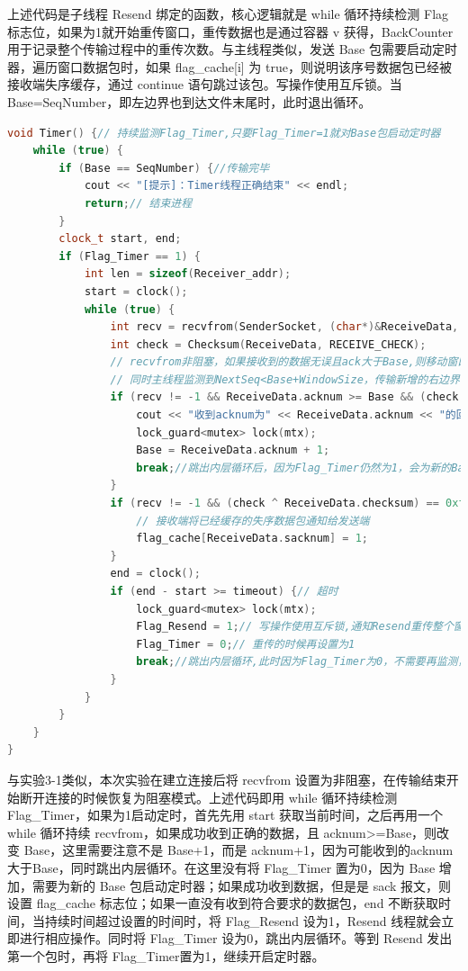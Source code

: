 \documentclass[UTF8,a4paper,10pt]{ctexart}
\begin{document}
上述代码是子线程 Resend 绑定的函数，核心逻辑就是 while 循环持续检测 Flag 标志位，如果为1就开始重传窗口，重传数据也是通过容器 v 获得，BackCounter 用于记录整个传输过程中的重传次数。与主线程类似，发送 Base 包需要启动定时器，遍历窗口数据包时，如果 flag\_cache[i] 为 true，则说明该序号数据包已经被接收端失序缓存，通过 continue 语句跳过该包。写操作使用互斥锁。当 Base=SeqNumber，即左边界也到达文件末尾时，此时退出循环。
\begin{lstlisting}[frame=trbl,language={C++}]
void Timer() {// 持续监测Flag_Timer,只要Flag_Timer=1就对Base包启动定时器
    while (true) {
        if (Base == SeqNumber) {//传输完毕
            cout << "[提示]：Timer线程正确结束" << endl;
            return;// 结束进程
        }
        clock_t start, end;
        if (Flag_Timer == 1) {
            int len = sizeof(Receiver_addr);
            start = clock();
            while (true) {
                int recv = recvfrom(SenderSocket, (char*)&ReceiveData, Receive_DatagramLen, 0, (struct sockaddr*)&Receiver_addr, &len);
                int check = Checksum(ReceiveData, RECEIVE_CHECK);
                // recvfrom非阻塞，如果接收到的数据无误且ack大于Base,则移动窗口左边界，用队列来实现
                // 同时主线程监测到NextSeq<Base+WindowSize，传输新增的右边界窗口，从而实现滑动窗口的功能
                if (recv != -1 && ReceiveData.acknum >= Base && (check ^ ReceiveData.checksum) == 0xffff && ReceiveData.ack == true) {
                    cout << "收到acknum为" << ReceiveData.acknum << "的回复" << endl;
                    lock_guard<mutex> lock(mtx);
                    Base = ReceiveData.acknum + 1;
                    break;//跳出内层循环后，因为Flag_Timer仍然为1，会为新的Base设置定时器
                }
                if (recv != -1 && (check ^ ReceiveData.checksum) == 0xffff && ReceiveData.sack == true) {
                    // 接收端将已经缓存的失序数据包通知给发送端
                    flag_cache[ReceiveData.sacknum] = 1;
                }
                end = clock();
                if (end - start >= timeout) {// 超时
                    lock_guard<mutex> lock(mtx);
                    Flag_Resend = 1;// 写操作使用互斥锁,通知Resend重传整个窗口
                    Flag_Timer = 0;// 重传的时候再设置为1
                    break;//跳出内层循环,此时因为Flag_Timer为0，不需要再监测，等待Resend重发Base包的时候设置Flag_Timer
                }
            }
        }
    }
}
\end{lstlisting}\par
与实验3-1类似，本次实验在建立连接后将 recvfrom 设置为非阻塞，在传输结束开始断开连接的时候恢复为阻塞模式。上述代码即用 while 循环持续检测 Flag\_Timer，如果为1启动定时，首先先用 start 获取当前时间，之后再用一个 while 循环持续 recvfrom，如果成功收到正确的数据，且 acknum>=Base，则改变 Base，这里需要注意不是 Base+1，而是 acknum+1，因为可能收到的acknum大于Base，同时跳出内层循环。在这里没有将 Flag\_Timer 置为0，因为 Base 增加，需要为新的 Base 包启动定时器；如果成功收到数据，但是是 sack 报文，则设置 flag\_cache 标志位；如果一直没有收到符合要求的数据包，end 不断获取时间，当持续时间超过设置的时间时，将 Flag\_Resend 设为1，Resend 线程就会立即进行相应操作。同时将 Flag\_Timer 设为0，跳出内层循环。等到 Resend 发出第一个包时，再将 Flag\_Timer置为1，继续开启定时器。
\end{document}
